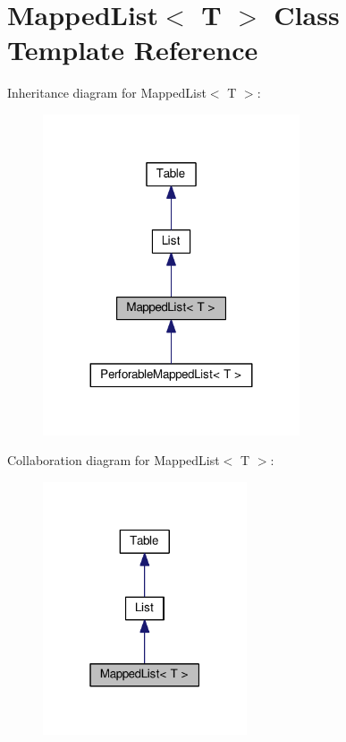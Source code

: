 \hypertarget{classMappedList}{}\section{Mapped\+List$<$ T $>$ Class Template Reference}
\label{classMappedList}


Inheritance diagram for Mapped\+List$<$ T $>$\+:
\nopagebreak
\begin{figure}[H]
\begin{center}
\leavevmode
\includegraphics[width=215pt]{classMappedList__inherit__graph}
\end{center}
\end{figure}


Collaboration diagram for Mapped\+List$<$ T $>$\+:
\nopagebreak
\begin{figure}[H]
\begin{center}
\leavevmode
\includegraphics[width=171pt]{classMappedList__coll__graph}
\end{center}
\end{figure}
